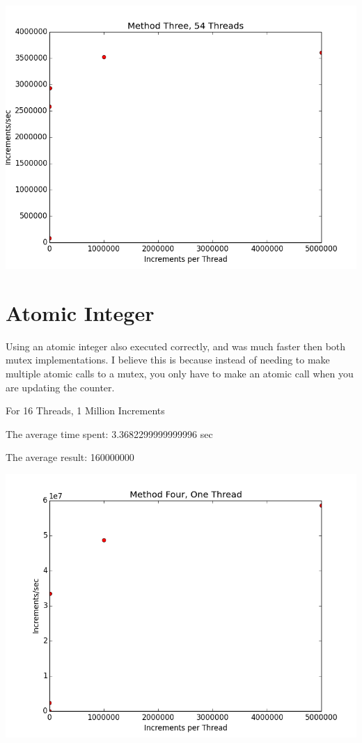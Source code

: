 \documentclass[12pt]{article}
\begin{document}
\includegraphics[scale=.5]{Graphs/MethodThree_54Thread.png}


\section*{Atomic Integer}
Using an atomic integer also executed correctly, and
was much faster then both mutex implementations. I believe this
is because instead of needing to make multiple atomic calls to
a mutex, you only have to make an atomic call when you are updating
the counter.

For 16 Threads, 1 Million Increments

The average time spent: 3.3682299999999996 sec

The average result: 160000000

\includegraphics[scale=.5]{Graphs/MethodFour_1Thread.png}
\end{document}
